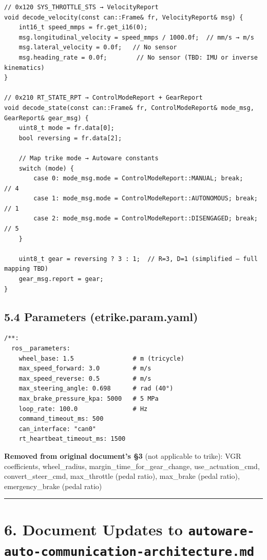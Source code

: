 \documentclass[12pt,a4paper,oneside]{report}
\begin{document}
\begin{verbatim}
// 0x120 SYS_THROTTLE_STS → VelocityReport
void decode_velocity(const can::Frame& fr, VelocityReport& msg) {
    int16_t speed_mmps = fr.get_i16(0);
    msg.longitudinal_velocity = speed_mmps / 1000.0f;  // mm/s → m/s
    msg.lateral_velocity = 0.0f;   // No sensor
    msg.heading_rate = 0.0f;        // No sensor (TBD: IMU or inverse kinematics)
}

// 0x210 RT_STATE_RPT → ControlModeReport + GearReport
void decode_state(const can::Frame& fr, ControlModeReport& mode_msg, GearReport& gear_msg) {
    uint8_t mode = fr.data[0];
    bool reversing = fr.data[2];
    
    // Map trike mode → Autoware constants
    switch (mode) {
        case 0: mode_msg.mode = ControlModeReport::MANUAL; break;      // 4
        case 1: mode_msg.mode = ControlModeReport::AUTONOMOUS; break;   // 1
        case 2: mode_msg.mode = ControlModeReport::DISENGAGED; break;   // 5
    }
    
    uint8_t gear = reversing ? 3 : 1;  // R=3, D=1 (simplified — full mapping TBD)
    gear_msg.report = gear;
}
\end{verbatim}

\subsection{5.4 Parameters
(etrike.param.yaml)}\label{parameters-etrike.param.yaml}

\begin{verbatim}
/**:
  ros__parameters:
    wheel_base: 1.5                # m (tricycle)
    max_speed_forward: 3.0         # m/s
    max_speed_reverse: 0.5         # m/s
    max_steering_angle: 0.698      # rad (40°)
    max_brake_pressure_kpa: 5000   # 5 MPa
    loop_rate: 100.0               # Hz
    command_timeout_ms: 500
    can_interface: "can0"
    rt_heartbeat_timeout_ms: 1500
\end{verbatim}

\textbf{Removed from original document's §3} (not applicable to trike): VGR
coefficients, wheel\_radius, margin\_time\_for\_gear\_change,
use\_actuation\_cmd, convert\_steer\_cmd, max\_throttle (pedal ratio),
max\_brake (pedal ratio), emergency\_brake (pedal ratio)

\begin{center}\rule{0.5\linewidth}{0.5pt}\end{center}

\section{\texorpdfstring{6. Document Updates to
\texttt{autoware-auto-communication-architecture.md}}{6. Document Updates to autoware-auto-communication-architecture.md}}\label{document-updates-to-autoware-auto-communication-architecture.md}
\end{document}
